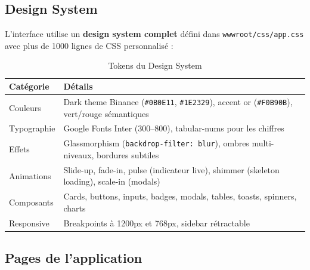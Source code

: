 \documentclass[12pt,a4paper]{article}
\begin{document}
\subsection{Design System}

L'interface utilise un \textbf{design system complet} défini dans \texttt{wwwroot/css/app.css} avec plus de 1000 lignes de CSS personnalisé :

\begin{table}[H]
\centering
\caption{Tokens du Design System}
\begin{tabularx}{\textwidth}{lX}
    \toprule
    \textbf{Catégorie} & \textbf{Détails} \\
    \midrule
    Couleurs & Dark theme Binance (\texttt{\#0B0E11}, \texttt{\#1E2329}), accent or (\texttt{\#F0B90B}), vert/rouge sémantiques \\
    Typographie & Google Fonts Inter (300--800), tabular-nums pour les chiffres \\
    Effets & Glassmorphism (\texttt{backdrop-filter: blur}), ombres multi-niveaux, bordures subtiles \\
    Animations & Slide-up, fade-in, pulse (indicateur live), shimmer (skeleton loading), scale-in (modals) \\
    Composants & Cards, buttons, inputs, badges, modals, tables, toasts, spinners, charts \\
    Responsive & Breakpoints à 1200px et 768px, sidebar rétractable \\
    \bottomrule
\end{tabularx}
\end{table}

\subsection{Pages de l'application}
\end{document}
